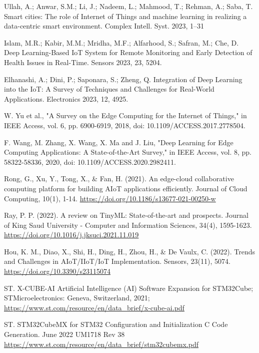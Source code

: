 \begin{thebibliography}{00}
Ullah, A.; Anwar, S.M.; Li, J.; Nadeem, L.; Mahmood, T.; Rehman, A.; Saba, T. Smart cities: The role of Internet of Things and machine learning in realizing a data-centric smart environment. Complex Intell. Syst. 2023, 1–31

Islam, M.R.; Kabir, M.M.; Mridha, M.F.; Alfarhood, S.; Safran, M.; Che, D. Deep Learning-Based IoT System for Remote Monitoring and Early Detection of Health Issues in Real-Time. Sensors 2023, 23, 5204.

Elhanashi, A.; Dini, P.; Saponara, S.; Zheng, Q. Integration of Deep Learning into the IoT: A Survey of Techniques and Challenges for Real-World Applications. Electronics 2023, 12, 4925.

W. Yu et al., "A Survey on the Edge Computing for the Internet of Things," in IEEE Access, vol. 6, pp. 6900-6919, 2018, doi: 10.1109/ACCESS.2017.2778504.

F. Wang, M. Zhang, X. Wang, X. Ma and J. Liu, "Deep Learning for Edge Computing Applications: A State-of-the-Art Survey," in IEEE Access, vol. 8, pp. 58322-58336, 2020, doi: 10.1109/ACCESS.2020.2982411.

Rong, G., Xu, Y., Tong, X., & Fan, H. (2021). An edge-cloud collaborative computing platform for building AIoT applications efficiently. Journal of Cloud Computing, 10(1), 1-14. 
\url{https://doi.org/10.1186/s13677-021-00250-w}

Ray, P. P. (2022). A review on TinyML: State-of-the-art and prospects. Journal of King Saud University - Computer and Information Sciences, 34(4), 1595-1623.
\url{https://doi.org/10.1016/j.jksuci.2021.11.019}

Hou, K. M., Diao, X., Shi, H., Ding, H., Zhou, H., & De Vaulx, C. (2022). Trends and Challenges in AIoT/IIoT/IoT Implementation. Sensors, 23(11), 5074.
\url{https://doi.org/10.3390/s23115074}

ST. X-CUBE-AI Artificial Intelligence (AI) Software Expansion for STM32Cube; STMicroelectronics: Geneva, Switzerland, 2021;
\url{https://www.st.com/resource/en/data_brief/x-cube-ai.pdf}

ST. STM32CubeMX for STM32 Configuration and Initialization C Code Generation. June 2022 UM1718 Rev 38
\url{https://www.st.com/resource/en/data_brief/stm32cubemx.pdf}


\end{thebibliography}
